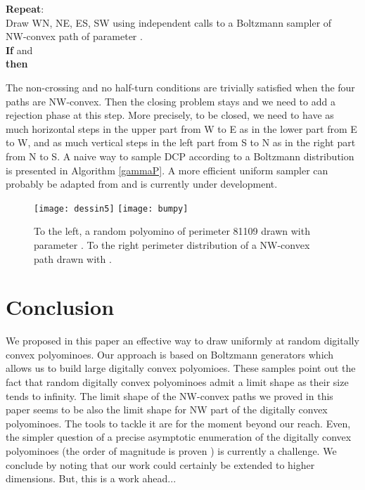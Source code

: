 \documentclass{article}
\begin{document}
\begin{algorithm}[!h]
\caption{}
\label{gammaP}
\textbf{Repeat}:\\
\hspace{0.6cm}Draw WN, NE, ES, SW using independent calls to a Boltzmann sampler of\\
\hspace{0.6cm}NW-convex path of parameter .\\
\hspace{0.6cm}\textbf{If}  and  \\
\hspace{.6cm}\textbf{then} \Return \\
\end{algorithm}

The non-crossing and no half-turn conditions are trivially satisfied when the four paths are NW-convex. Then the closing problem stays and we need to add a rejection phase at this step.
More precisely, to be closed, we need to have as much horizontal steps in the upper part from W to E as
 in the lower part from E to W, and as much vertical steps in the left part from S to N as in the right part from N to S. 
 A naive way to sample DCP according to a Boltzmann distribution is presented in Algorithm \ref{gammaP}. A more efficient uniform sampler can probably be adapted from \cite{BoGaRo10} and is currently under development. 




\begin{figure}[!h]

\hspace{-0.45cm}
\texttt{[image: dessin5]}
\texttt{[image: bumpy]}
\hspace{-0.35cm}
\caption{To the left, a random polyomino of perimeter 81109 drawn with parameter . 
To the right perimeter distribution of a NW-convex path drawn with .}
\label{grosdessin}
\end{figure}
\section*{Conclusion}
We proposed in this paper an effective way to draw uniformly at random
digitally convex polyominoes. Our approach is based on Boltzmann
generators which allows us to build large digitally convex polyomioes.
These samples
point out the fact that random digitally convex polyominoes admit a
limit shape as their size tends to infinity. The limit shape of the NW-convex paths we proved in this paper seems to be also 
the limit shape for NW part of the digitally convex polyominoes. The tools to
tackle it are for the moment beyond our reach. 
Even, the simpler question of a precise asymptotic enumeration of the digitally convex polyominoes
 (the order of magnitude is proven \cite{IvKoZu94}) is currently a challenge. We conclude by noting that our
work could certainly be extended to higher dimensions. But, this is a
work ahead...
\end{document}
